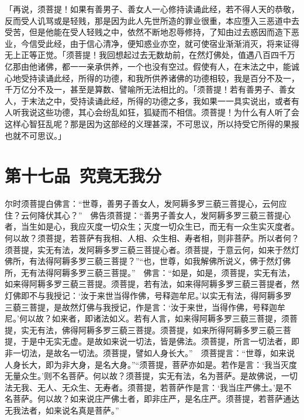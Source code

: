 \documentclass[12pt,twoside,openany]{book}
\newcommand{\kai}[1]{{\CJKfamily{kai}#1}}
\begin{document}
\kai{「再说，须菩提！如果有善男子、善女人一心修持读诵此经，若不得人天的恭敬，反而受人讥骂或是轻贱，那是因为此人先世所造的罪业很重，本应堕入三恶道中去受苦，但是他能在受人轻贱之中，依然不断地忍辱修持，了知由过去惑因而造下恶业，今信受此经，由于信心清净，便知惑业亦空，就可使宿业渐渐消灭，将来证得无上正等正觉。「须菩提！我回想起过去无数劫前，在然灯佛处，值遇八百四千万亿那由他诸佛，都一一亲承供养，一个也没有空过。假使有人，在末法之中，能诚心地受持读诵此经，所得的功德，和我所供养诸佛的功德相较，我是百分不及一，千万亿分不及一，甚至是算数、譬喻所无法相比的。「须菩提！若有善男子、善女人，于末法之中，受持读诵此经，所得的功德之多，我如果一一具实说出，或者有人听我说这些功德，其心会纷乱如狂，狐疑而不相信。须菩提！为什么有人听了会这样心智狂乱呢？那是因为这部经的义理甚深，不可思议，所以持受它所得的果报也就不可思议。」}


\chapter{第十七品\ 究竟无我分}
\begin{pinyinscope}
尔时须菩提白佛言：“世尊，善男子善女人，发阿耨多罗三藐三菩提心，云何应住？云何降伏其心？”　佛告须菩提：“善男子善女人，发阿耨多罗三藐三菩提心者，当生如是心，我应灭度一切众生；灭度一切众生已，而无有一众生实灭度者。何以故？须菩提，若菩萨有我相、人相、众生相、寿者相，则非菩萨。所以者何？须菩提，实无有法，发阿耨多罗三藐三菩提心者。须菩提，于意云何，如来于然灯佛所，有法得阿耨多罗三藐三菩提？”“也，世尊，如我解佛所说义，佛于然灯佛所，无有法得阿耨多罗三藐三菩提。”　佛言：“如是，如是，须菩提，实无有法，如来得阿耨多罗三藐三菩提。须菩提，若有法，如来得阿耨多罗三藐三菩提者，然灯佛即不与我授记：‘汝于来世当得作佛，号释迦牟尼。’以实无有法，得阿耨多罗三藐三菩提，是故然灯佛与我授记，作是言：‘汝于来世，当得作佛，号释迦牟尼。’何以故？如来者，即诸法如义。若有人言，如来得阿耨多罗三藐三菩提，须菩提，实无有法，佛得阿耨多罗三藐三菩提。须菩提，如来所得阿耨多罗三藐三菩提，于是中无实无虚。是故如来说一切法，皆是佛法。须菩提，所言一切法者，即非一切法，是故名一切法。须菩提，譬如人身长大。”　须菩提言：“世尊，如来说人身长大，即为非大身，是名大身。”“须菩提，菩萨亦如是。若作是言：‘我当灭度无量众生。’则不名菩萨。何以故？须菩提，实无有法，名为菩萨。是故佛说，一切法无我、无人、无众生、无寿者。须菩提，若菩萨作是言：‘我当庄严佛土。’是不名菩萨。何以故？如来说庄严佛土者，即非庄严，是名庄严。须菩提，若菩萨通达无我法者，如来说名真是菩萨。”
\end{pinyinscope}
\end{document}
